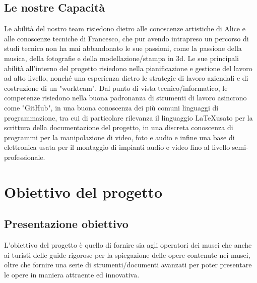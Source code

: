 \documentclass[hidelinks,12pt,a4paper]{article}
\begin{document}
\begin{flushleft}
			
			\subsection{Le nostre Capacità}
			Le abilità del nostro team risiedono dietro alle conoscenze artistiche di Alice
			e alle conoscenze tecniche di Francesco, che pur avendo intrapreso un percorso di studi tecnico non ha mai abbandonato le sue passioni, come la passione della musica, della fotografie e della modellazione/stampa in 3d. Le sue principali abilità all'interno del progetto risiedono nella pianificazione e gestione del lavoro ad alto livello, nonché una esperienza dietro le strategie di lavoro aziendali e di costruzione di un "workteam". Dal punto di vista tecnico/informatico, le competenze risiedono nella buona padronanza di strumenti di lavoro asincrono come "GitHub", in una buona conoscenza dei più comuni linguaggi di programmazione, tra cui di particolare rilevanza il linguaggio \LaTeX usato per la scrittura della documentazione del progetto, in una discreta conoscenza di programmi per la manipolazione di video, foto e audio e infine una base di elettronica usata per il montaggio di impianti audio e video fino al livello semi-professionale.
			
		
		\section{Obiettivo del progetto}
			\subsection{Presentazione obiettivo}
			L'obiettivo del progetto è quello di fornire sia agli operatori dei musei che anche ai turisti delle guide rigorose per la spiegazione delle opere contenute nei musei, oltre che fornire una serie di strumenti/documenti avanzati per poter presentare le opere in maniera attraente ed innovativa.
			

\end{flushleft}
\end{document}
